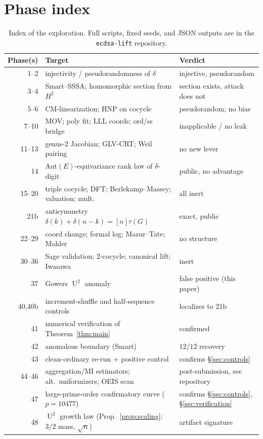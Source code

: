 \documentclass[11pt]{article}
\theoremstyle{definition}
\DeclareMathOperator{\Uk}{U}
\begin{document}
\appendix
\section{Phase index}\label{app:phases}

\begin{table}[H]
\centering
\small
\begin{tabular}{rll}
\toprule
Phase(s) & Target & Verdict\\
\midrule
1--2   & injectivity / pseudorandomness of $\delta$ & injective, pseudorandom\\
3--4   & Smart--SSSA; homomorphic section from $H^2$ & section exists, attack does not\\
5--6   & CM-linearization; HNP on cocycle & pseudorandom; no bias\\
7--10  & MOV; poly fit; LLL coords; ord/ss bridge & inapplicable / no leak\\
11--13 & genus-2 Jacobian; GLV-CRT; Weil pairing & no new lever\\
14     & Aut$(E)$-equivariance rank law of $\delta$-digit & public, no advantage\\
15--20 & triple cocycle; DFT; Berlekamp--Massey; valuation; mult. & all inert\\
21b    & antisymmetry $\delta(k)+\delta(n-k)=[n]\tau(G)$ & exact, public\\
22--29 & coord change; formal log; Mazur--Tate; Mahler & no structure\\
30--36 & Sage validation; $2$-cocycle; canonical lift; Iwasawa & inert\\
37     & Gowers $\Uk^2$ anomaly & false positive (this paper)\\
40,40b & increment-shuffle and half-sequence controls & localizes to 21b\\
41     & numerical verification of Theorem~\ref{thm:main} & confirmed\\
42     & anomalous boundary (Smart) & $12/12$ recovery\\
43     & clean-ordinary re-run + positive control & confirms \S\ref{sec:controls}\\
44--46 & aggregation/MI estimators; alt.\ uniformizers; OEIS scan & post-submission, see repository\\
47     & large-prime-order confirmatory curve ($p=10477$) & confirms \S\ref{sec:controls}, \S\ref{sec:verification}\\
48     & $\Uk^2$ growth law (Prop.~\ref{prop:scaling}: $3/2$ mass, $\sqrt n$) & artifact signature\\
\bottomrule
\end{tabular}
\caption{Index of the exploration. Full scripts, fixed seeds, and JSON
outputs are in the \texttt{ecdsa-lift} repository.}
\end{table}
\end{document}

